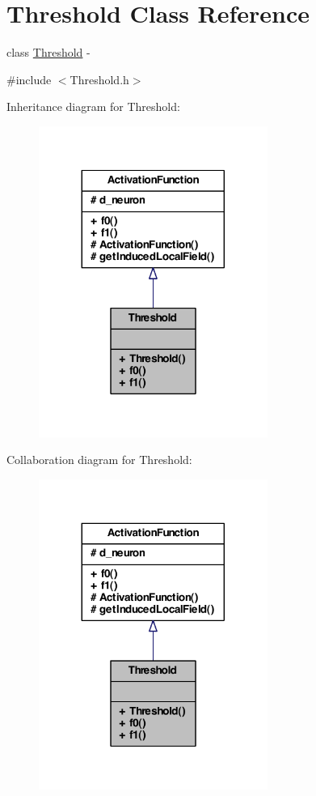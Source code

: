 \hypertarget{class_threshold}{
\section{Threshold Class Reference}
\label{class_threshold}
}


class \hyperlink{class_threshold}{Threshold} -\/  




{\ttfamily \#include $<$Threshold.h$>$}



Inheritance diagram for Threshold:\nopagebreak
\begin{figure}[H]
\begin{center}
\leavevmode
\includegraphics[width=212pt]{class_threshold__inherit__graph}
\end{center}
\end{figure}


Collaboration diagram for Threshold:\nopagebreak
\begin{figure}[H]
\begin{center}
\leavevmode
\includegraphics[width=212pt]{class_threshold__coll__graph}
\end{center}
\end{figure}

